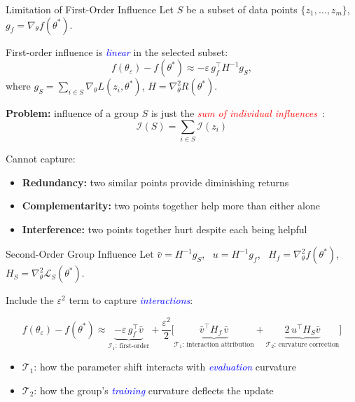 \documentclass[aspectratio=169]{beamer}
\renewcommand{\emph}[1]{\textit{\textcolor{blue}{#1}}}
\newcommand{\remph}[1]{\textit{\textcolor{red}{#1}}}
\begin{document}
\begin{frame}{Limitation of First-Order Influence}
    Let $S$ be a subset of data points $\{z_1, \dots, z_m\}$, $g_f = \nabla_\theta f(\theta^*)$.

    \vspace{0.3cm}
    First-order influence is \emph{linear} in the selected subset:
    \begin{equation}
        f(\theta_\varepsilon) - f(\theta^*) \approx -\varepsilon \, g_f^\top H^{-1} g_S,
    \end{equation}
    where $g_S = \sum_{i \in S} \nabla_\theta L(z_i, \theta^*)$, $H = \nabla_\theta^2 R(\theta^*)$.

    \pause
    \vspace{0.5cm}
    \textbf{Problem:} influence of a group $S$ is just the \remph{sum of individual influences}~\citep{koh2019accuracy}:
    \[
        \mathcal{I}(S) = \sum_{i \in S} \mathcal{I}(z_i)
    \]

    \pause
    \vspace{0.3cm}
    Cannot capture:
    \begin{itemize}
        \item \textbf{Redundancy:} two similar points provide diminishing returns
        \item \textbf{Complementarity:} two points together help more than either alone
        \item \textbf{Interference:} two points together hurt despite each being helpful
    \end{itemize}
\end{frame}


\begin{frame}{Second-Order Group Influence}
    Let $\bar{v} = H^{-1}g_S$, \ $u = H^{-1}g_f$, \ $H_f = \nabla_\theta^2 f(\theta^*)$, \ $H_S = \nabla_\theta^2 \mathcal{L}_S(\theta^*)$.

    \vspace{0.5cm}
    Include the $\varepsilon^2$ term to capture \emph{interactions}:

    \begin{equation}
        f(\theta_\varepsilon) - f(\theta^*) \approx
        \underbrace{-\varepsilon \, g_f^\top \bar{v}}_{\mathcal{I}_1 \text{: first-order}}
        + \frac{\varepsilon^2}{2}\bigg[
        \underbrace{\bar{v}^\top H_f \, \bar{v}}_{\mathcal{T}_1 \text{: interaction attribution}}
        + \underbrace{2\, u^\top H_S \bar{v}}_{\mathcal{T}_2 \text{: curvature correction}}
        \bigg]
    \end{equation}

    \vspace{0.5cm}
    \begin{itemize}
        \item $\mathcal{T}_1$: how the parameter shift interacts with \emph{evaluation} curvature
        \item $\mathcal{T}_2$: how the group's \emph{training} curvature deflects the update
    \end{itemize}
\end{frame}
\end{document}
